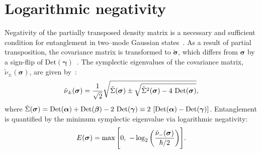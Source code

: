\documentclass[aps,prl,reprint,superscriptaddress,nofootinbib,floatfix]{revtex4-2}
\begin{document}
\section{Logarithmic negativity}

Negativity of the partially transposed density matrix is a necessary and sufficient condition for entanglement in two--mode Gaussian states~\cite{PPTCrit-CV-Simon2000}. As a result of partial transposition, the covariance matrix is transformed to $\tilde{\bm{\sigma}}$, which differs from $\bm{\sigma}$ by a sign-flip of $\text{Det} (\bm{\gamma})$~\cite{Negativity-Gaussian-Adesso2005}.
The symplectic eigenvalues of the covariance matrix, $\tilde{\nu}_{\pm}(\bm{\sigma})$, are given by~\cite{Negativity-CV-Serafini2004,Negativity-Vidal2002}:
\begin{equation}
	\tilde{\nu}_{\pm}(\bm{\sigma}) =  \frac{1}{\sqrt{2}} \sqrt{
	 \tilde{\Sigma}(\bm{\sigma}) \pm \sqrt{\tilde{\Sigma}^2(\bm{\sigma}) - 4 \ \text{Det}\qty( \bm{\sigma} ) } }  ,
\end{equation}
where $\tilde{\Sigma}(\bm{\sigma}) = \text{Det} (\bm{\alpha}) + \text{Det} ( \bm{\beta}) - 2 \ \text{Det} ( \bm{\gamma} ) \equiv 2 \ \qty[ \text{Det} (\bm{\alpha}) - \text{Det} ( \bm{\gamma} ) ] $. Entanglement is quantified by the minimum symplectic eigenvalue via logarithmic negativity:
\begin{equation}
	E(\bm{\sigma}) = \max \Bigg[ 0, \ -\log_2\qty(  \frac{\tilde\nu_-(\bm{\sigma})}{\hbar/2} ) \Bigg].
	\label{eq:E_from_covmat}
\end{equation}







\end{document}
